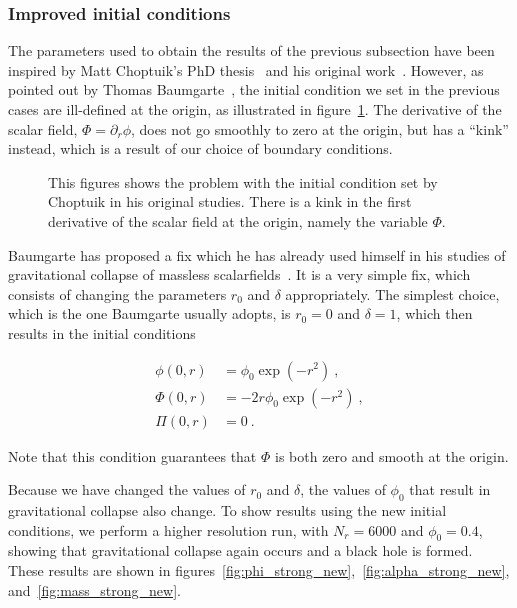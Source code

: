 \documentclass[a4paper,11pt]{article}
\renewcommand{\d}{\delta}
\newcommand{\pd}{\partial}
\newcommand{\lrpar}[1]{\left( #1 \right)}
\newcommand{\n}{\noindent}
\newcommand{\eq}[1]{
  \begin{equation}
    #1
  \end{equation}
}
\newcommand{\spl}[1]{
  \begin{split}
    #1
  \end{split}
}
\begin{document}
\subsubsection{Improved initial conditions}

The parameters used to obtain the results of the previous subsection have been inspired by Matt Choptuik's PhD thesis~\cite{Choptuik_1986} and his original work~\cite{PhysRevLett.70.9}. However, as pointed out by Thomas Baumgarte~\cite{Baumgarte_private}, the initial condition we set in the previous cases are ill-defined at the origin, as illustrated in figure~\ref{fig:origin_problem}. The derivative of the scalar field, $\Phi=\pd_{r}\phi$, does not go smoothly to zero at the origin, but has a ``kink'' instead, which is a result of our choice of boundary conditions.

\begin{figure}[ht]
  \centering
  
  \caption[Problem with the initial condition at the origin.]{This figures shows the problem with the initial condition set by Choptuik in his original studies. There is a kink in the first derivative of the scalar field at the origin, namely the variable $\Phi$.}
  \label{fig:origin_problem}
\end{figure}

Baumgarte has proposed a fix which he has already used himself in his studies of gravitational collapse of massless scalarfields~\cite{Baumgarte_2018}. It is a very simple fix, which consists of changing the parameters $r_{0}$ and $\delta$ appropriately. The simplest choice, which is the one Baumgarte usually adopts, is $r_{0}=0$ and $\d=1$, which then results in the initial conditions

\eq{
  \spl{
    \phi(0,r) &= \phi_{0}\exp\lrpar{-r^{2}}\ ,\\
    \Phi(0,r) &= -2r\phi_{0}\exp\lrpar{-r^{2}}\ ,\\
    \Pi(0,r) &= 0\ .
  }
  \label{eq:initial_condition_new}
}

\n Note that this condition guarantees that $\Phi$ is both zero and smooth at the origin.

Because we have changed the values of $r_{0}$ and $\d$, the values of $\phi_{0}$ that result in gravitational collapse also change. To show results using the new initial conditions, we perform a higher resolution run, with $N_{r}=6000$ and $\phi_{0}=0.4$, showing that gravitational collapse again occurs and a black hole is formed. These results are shown in figures~\ref{fig:phi_strong_new},~\ref{fig:alpha_strong_new}, and~\ref{fig:mass_strong_new}.
\end{document}
